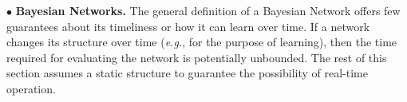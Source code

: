 \documentclass[conference]{IEEEtran}
\begin{document}
%
%

$\bullet$ {\bf Bayesian Networks.}
The general definition of a Bayesian Network offers few guarantees about its timeliness or how it can learn over time. If a network changes its structure over time (\emph{e.g.}, for the purpose of learning), then the time required for evaluating the network is potentially unbounded. The rest of this section assumes a static structure to guarantee the possibility of real-time operation.
\end{document}
